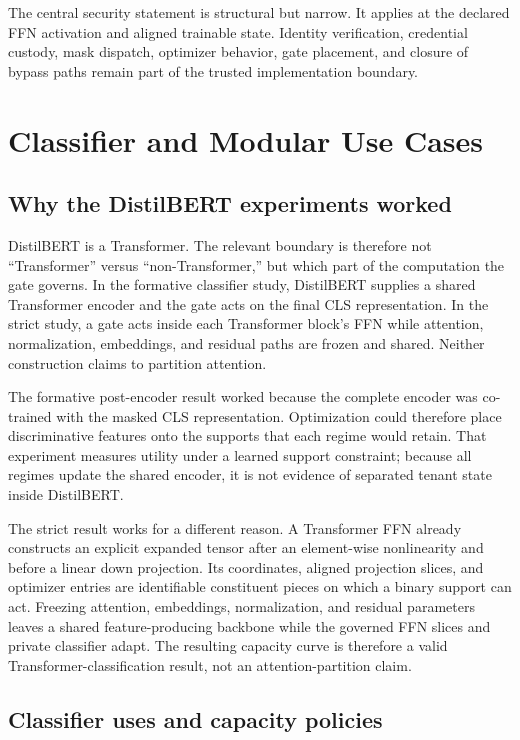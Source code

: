 \documentclass[11pt]{article}
\begin{document}
The central security statement is structural but narrow. It applies at the
declared FFN activation and aligned trainable state. Identity verification,
credential custody, mask dispatch, optimizer behavior, gate placement, and
closure of bypass paths remain part of the trusted implementation boundary.

\section{Classifier and Modular Use Cases}

\subsection{Why the DistilBERT experiments worked}

DistilBERT is a Transformer. The relevant boundary is therefore not
``Transformer'' versus ``non-Transformer,'' but which part of the computation
the gate governs. In the formative classifier study, DistilBERT supplies a
shared Transformer encoder and the gate acts on the final CLS representation.
In the strict study, a gate acts inside each Transformer block's FFN while
attention, normalization, embeddings, and residual paths are frozen and
shared. Neither construction claims to partition attention.

The formative post-encoder result worked because the complete encoder was
co-trained with the masked CLS representation. Optimization could therefore
place discriminative features onto the supports that each regime would retain.
That experiment measures utility under a learned support constraint; because
all regimes update the shared encoder, it is not evidence of separated tenant
state inside DistilBERT.

The strict result works for a different reason. A Transformer FFN already
constructs an explicit expanded tensor after an element-wise nonlinearity and
before a linear down projection. Its coordinates, aligned projection slices,
and optimizer entries are identifiable constituent pieces on which a binary
support can act. Freezing attention, embeddings, normalization, and residual
parameters leaves a shared feature-producing backbone while the governed FFN
slices and private classifier adapt. The resulting capacity curve is therefore
a valid Transformer-classification result, not an attention-partition claim.

\subsection{Classifier uses and capacity policies}
\end{document}

